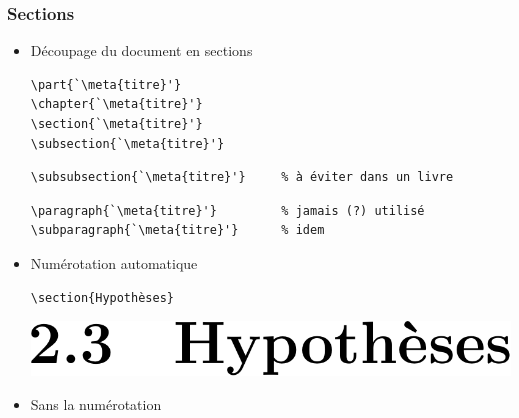 \begin{frame}[fragile=singleslide]
  \frametitle{Sections}
  \begin{itemize}
  \item Découpage du document en sections
\begin{lstlisting}
\part{`\meta{titre}'}
\chapter{`\meta{titre}'}
\section{`\meta{titre}'}
\subsection{`\meta{titre}'}
\end{lstlisting}
\begin{lstlisting}
\subsubsection{`\meta{titre}'}     % à éviter dans un livre
\end{lstlisting}
\begin{lstlisting}
\paragraph{`\meta{titre}'}         % jamais (?) utilisé
\subparagraph{`\meta{titre}'}      % idem
\end{lstlisting}
  \item Numérotation automatique
    \begin{demo}
      \begin{minipage}{0.45\linewidth}
\begin{lstlisting}
\section{Hypothèses}
\end{lstlisting}
      \end{minipage}
      \hfill
      \begin{minipage}{0.45\linewidth}
        \includegraphics[height=0.8\baselineskip,keepaspectratio]{section-num}
      \end{minipage}
    \end{demo}
  \item Sans la numérotation
    \begin{demo}
      \begin{minipage}{0.45\linewidth}
\begin{lstlisting}

\end{lstlisting}
\end{minipage}
\end{demo}
\end{itemize}
\end{frame}
